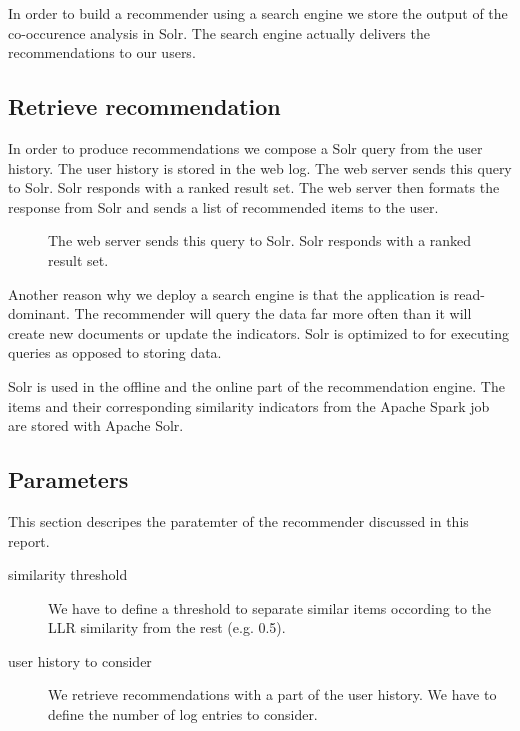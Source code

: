 In order to build a recommender using a search engine we store the output of the co-occurence analysis in Solr. The search engine actually delivers the recommendations to our users.

\subsection{Retrieve recommendation}

In order to produce recommendations we compose a Solr query from the user history. The user history is stored in the web log. The web server sends this query to Solr. Solr responds with a ranked result set. The web server then formats the response from Solr and sends a list of recommended items to the user.

\begin{figure}
\centering
{}
\caption{The web server sends this query to Solr. Solr responds with a ranked result set.}
\end{figure}


Another reason why we deploy a search engine is that the application is read-dominant. The recommender will query the data far more often than it will create new documents or update the indicators. Solr is optimized to for executing queries as opposed to storing data.

Solr is used in the offline and the online part of the recommendation engine.
The items and their corresponding similarity indicators from the Apache Spark job are stored with Apache Solr. 

\subsection{Parameters}
\label{sec:parameters}

This section descripes the paratemter of the recommender discussed in this report.
\begin{description}
\item[similarity threshold] We have to define a threshold to separate similar items occording to the LLR similarity from the rest (e.g. 0.5).
\item[user history to consider] We retrieve recommendations with a part of the user history. We have to define the number of log entries to consider.
\end{description}
